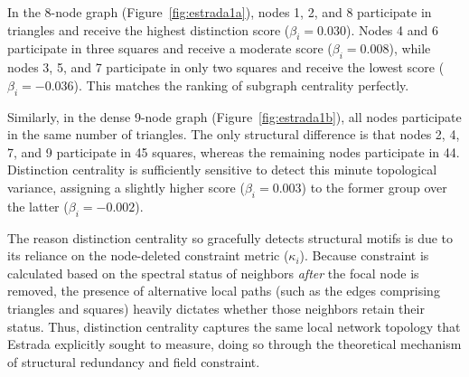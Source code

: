 


In the 8-node graph (Figure~\ref{fig:estrada1a}), nodes 1, 2, and 8 participate in triangles and receive the highest distinction score ($\beta_i = 0.030$). Nodes 4 and 6 participate in three squares and receive a moderate score ($\beta_i = 0.008$), while nodes 3, 5, and 7 participate in only two squares and receive the lowest score ($\beta_i = -0.036$). This matches the ranking of subgraph centrality perfectly. 

Similarly, in the dense 9-node graph (Figure~\ref{fig:estrada1b}), all nodes participate in the same number of triangles. The only structural difference is that nodes 2, 4, 7, and 9 participate in 45 squares, whereas the remaining nodes participate in 44. Distinction centrality is sufficiently sensitive to detect this minute topological variance, assigning a slightly higher score ($\beta_i = 0.003$) to the former group over the latter ($\beta_i = -0.002$).

The reason distinction centrality so gracefully detects structural motifs is due to its reliance on the node-deleted constraint metric ($\kappa_i$). Because constraint is calculated based on the spectral status of neighbors \emph{after} the focal node is removed, the presence of alternative local paths (such as the edges comprising triangles and squares) heavily dictates whether those neighbors retain their status. Thus, distinction centrality captures the same local network topology that Estrada explicitly sought to measure, doing so through the theoretical mechanism of structural redundancy and field constraint.

